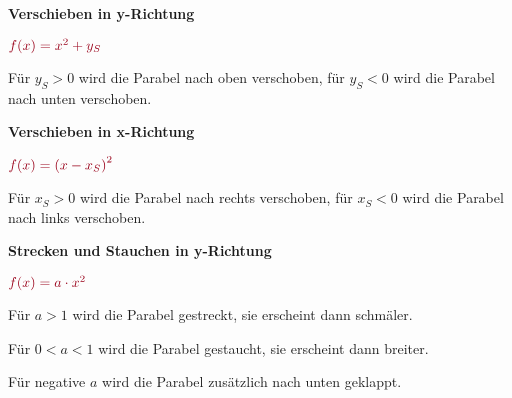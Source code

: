 \begin{minipage}{\textwidth}
%
%
%
\end{minipage}
\textbf{Verschieben in y-Richtung}
\begin{tcolorbox}\centering
	\(\textcolor{loestc}{f(x)=x^2+y_S}\)
\end{tcolorbox}
\textcolor{loes}{Für \(y_S>0\) wird die Parabel nach oben verschoben, für \(y_S<0\) wird die Parabel nach unten verschoben.}

\bigskip

\textbf{Verschieben in x-Richtung}
\begin{tcolorbox}\centering
	\(\textcolor{loestc}{f(x)=\left(x-x_S\right)^2}\)
\end{tcolorbox}
\textcolor{loes}{Für \(x_S>0\) wird die Parabel nach rechts verschoben, für \(x_S<0\) wird die Parabel nach links verschoben.}

\bigskip

\textbf{Strecken und Stauchen in y-Richtung}
\begin{tcolorbox}\centering
	\(\textcolor{loestc}{f(x)=a\cdot x^2}\)
\end{tcolorbox}
\textcolor{loes}{Für \(a>1\) wird die Parabel gestreckt, sie erscheint dann schmäler.}

\textcolor{loes}{Für \(0<a<1\) wird die Parabel gestaucht, sie erscheint dann breiter.}

\textcolor{loes}{Für negative \(a\) wird die Parabel zusätzlich nach unten geklappt.}

